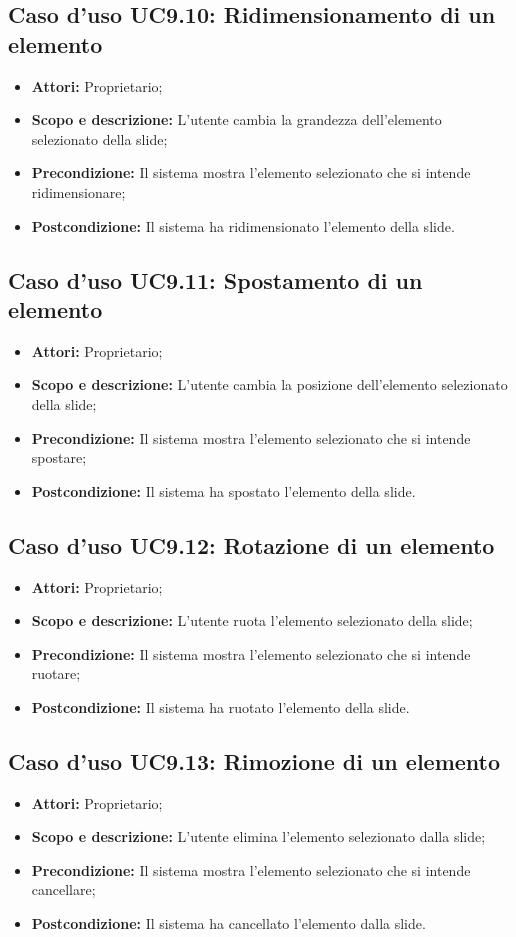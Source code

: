 \subsection{Caso d'uso UC9.10: Ridimensionamento di un elemento}
\begin{itemize}
	\item \textbf{Attori:} Proprietario;
	\item \textbf{Scopo e descrizione:} L'utente cambia la grandezza dell'elemento selezionato della slide;
	\item \textbf{Precondizione:} Il sistema mostra l'elemento selezionato che si intende ridimensionare;
	\item \textbf{Postcondizione:} Il sistema ha ridimensionato l'elemento della slide.
\end{itemize}


\subsection{Caso d'uso UC9.11: Spostamento di un elemento}
\begin{itemize}
	\item \textbf{Attori:} Proprietario;
	\item \textbf{Scopo e descrizione:} L'utente cambia la posizione dell'elemento selezionato della slide;
	\item \textbf{Precondizione:} Il sistema mostra l'elemento selezionato che si intende spostare;
	\item \textbf{Postcondizione:} Il sistema ha spostato l'elemento della slide.
\end{itemize}


\subsection{Caso d'uso UC9.12: Rotazione di un elemento}
\begin{itemize}
	\item \textbf{Attori:} Proprietario;
	\item \textbf{Scopo e descrizione:} L'utente ruota l'elemento selezionato della slide;
	\item \textbf{Precondizione:} Il sistema mostra l'elemento selezionato che si intende ruotare;
	\item \textbf{Postcondizione:} Il sistema ha ruotato l'elemento della slide.
\end{itemize}


\subsection{Caso d'uso UC9.13: Rimozione di un elemento}
\begin{itemize}
	\item \textbf{Attori:} Proprietario;
	\item \textbf{Scopo e descrizione:} L'utente elimina l'elemento selezionato dalla slide;
	\item \textbf{Precondizione:} Il sistema mostra l'elemento selezionato che si intende cancellare;
	\item \textbf{Postcondizione:} Il sistema ha cancellato l'elemento dalla slide.
\end{itemize}



